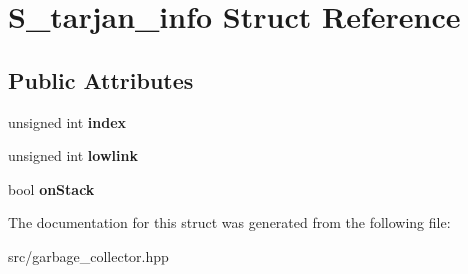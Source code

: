 \hypertarget{struct_s__tarjan__info}{\section{S\-\_\-tarjan\-\_\-info Struct Reference}
\label{struct_s__tarjan__info}
}
\subsection*{Public Attributes}
\begin{DoxyCompactItemize}
\item 
\hypertarget{struct_s__tarjan__info_a054e1b778032beb34b3f9edd521c3c9d}{unsigned int {\bfseries index}}\label{struct_s__tarjan__info_a054e1b778032beb34b3f9edd521c3c9d}

\item 
\hypertarget{struct_s__tarjan__info_a59d2913d1d63aefdeaa855805b7c6e15}{unsigned int {\bfseries lowlink}}\label{struct_s__tarjan__info_a59d2913d1d63aefdeaa855805b7c6e15}

\item 
\hypertarget{struct_s__tarjan__info_a9a78c59b92d785199271341da32acb92}{bool {\bfseries on\-Stack}}\label{struct_s__tarjan__info_a9a78c59b92d785199271341da32acb92}

\end{DoxyCompactItemize}


The documentation for this struct was generated from the following file\-:\begin{DoxyCompactItemize}
\item 
src/garbage\-\_\-collector.\-hpp\end{DoxyCompactItemize}

